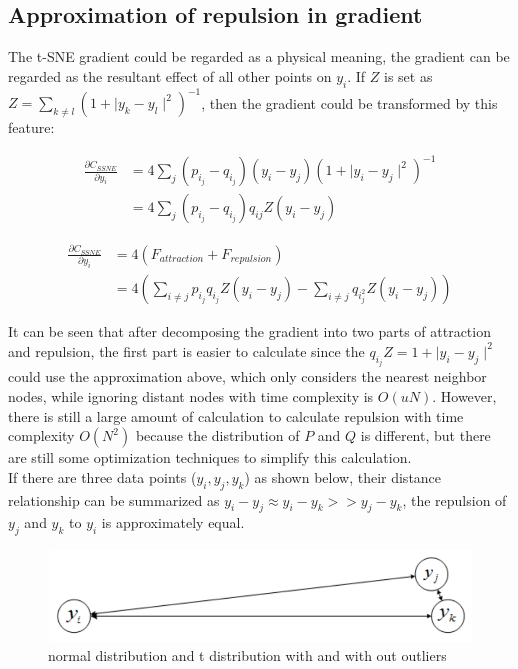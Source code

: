 \subsection{Approximation of repulsion in gradient}

The t-SNE gradient could be regarded as a physical meaning, the gradient can be regarded as the resultant effect of all other points on $y_i$. If $Z$ is set as $Z = \sum_{k \neq l} (1+ \mid y_k−y_l \mid ^2)^{-1}$, then the gradient could be transformed by this feature:

\begin{equation*}
\begin{aligned}
\frac{\partial C_{SSNE}}{\partial y_i} &= {4\sum_j(p_i_j - q_i_j)(y_i - y_j)(1 + \mid y_i - y_j \mid ^ 2) ^{-1}}\\
&= {4\sum_j(p_i_j - q_i_j) q_{ij}Z(y_i - y_j)}
\end{aligned}
\end{equation*}

\begin{equation*}
\begin{aligned}
\frac{\partial C_{SSNE}}{\partial y_i} &= {4(F_{attraction} + F_{repulsion})}\\
&= 4({\sum_{i \neq j}p_i_j q_i_j Z (y_i - y_j)} - {\sum_{i \neq j}q_i_j^2 Z (y_i - y_j)}) 
\end{aligned}
\end{equation*}

\noindent It can be seen that after decomposing the gradient into two parts of attraction and repulsion, the first part is easier to calculate since the $q_i_j Z = 1 + \mid y_i - y_j \mid ^ 2 $ could use the approximation above, which only considers the nearest neighbor nodes, while ignoring distant nodes with time complexity is $O(uN)$. However, there is still a large amount of calculation to calculate repulsion with time complexity $O(N^2)$ because the distribution of $P$ and $Q$ is different, but there are still some optimization techniques to simplify this calculation.\\

\noindent If there are three data points ($y_i,y_j,y_k$) as shown below, their distance relationship can be summarized as $y_i−y_j ≈ y_i−y_k >> y_j−y_k$, the repulsion of $y_j$ and $y_k$ to $y_i$ is approximately equal.

\begin{figure}[ht]

\centering
\includegraphics[scale=0.6]{images/image_point_region_1.PNG}
\caption{normal distribution and t distribution with and with out outliers}
\label{fig:label}
\end{figure}

